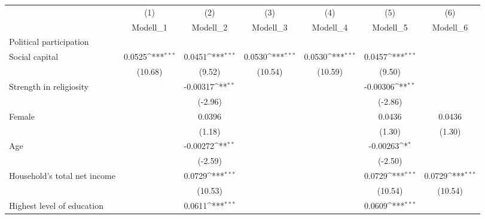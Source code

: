 {
\def\sym#1{\ifmmode^{#1}\else\(^{#1}\)\fi}
\begin{tabular}{l*{6}{c}}
\hline\hline
                &\multicolumn{1}{c}{(1)}         &\multicolumn{1}{c}{(2)}         &\multicolumn{1}{c}{(3)}         &\multicolumn{1}{c}{(4)}         &\multicolumn{1}{c}{(5)}         &\multicolumn{1}{c}{(6)}         \\
                & Modell\_1         & Modell\_2         & Modell\_3         & Modell\_4         & Modell\_5         & Modell\_6         \\
\hline
Political participation&                  &                  &                  &                  &                  &                  \\
Social capital  &   0.0525\sym{***}&   0.0451\sym{***}&   0.0530\sym{***}&   0.0530\sym{***}&   0.0457\sym{***}&                  \\
                &  (10.68)         &   (9.52)         &  (10.54)         &  (10.59)         &   (9.50)         &                  \\
Strength in religiosity&                  & -0.00317\sym{**} &                  &                  & -0.00306\sym{**} &                  \\
                &                  &  (-2.96)         &                  &                  &  (-2.86)         &                  \\
Female          &                  &   0.0396         &                  &                  &   0.0436         &   0.0436         \\
                &                  &   (1.18)         &                  &                  &   (1.30)         &   (1.30)         \\
Age             &                  & -0.00272\sym{**} &                  &                  & -0.00263\sym{*}  &                  \\
                &                  &  (-2.59)         &                  &                  &  (-2.50)         &                  \\
Household's total net income&                  &   0.0729\sym{***}&                  &                  &   0.0729\sym{***}&   0.0729\sym{***}\\
                &                  &  (10.53)         &                  &                  &  (10.54)         &  (10.54)         \\
Highest level of education&                  &   0.0611\sym{***}&                  &                  &   0.0609\sym{***}&                  \\

\end{tabular}}
